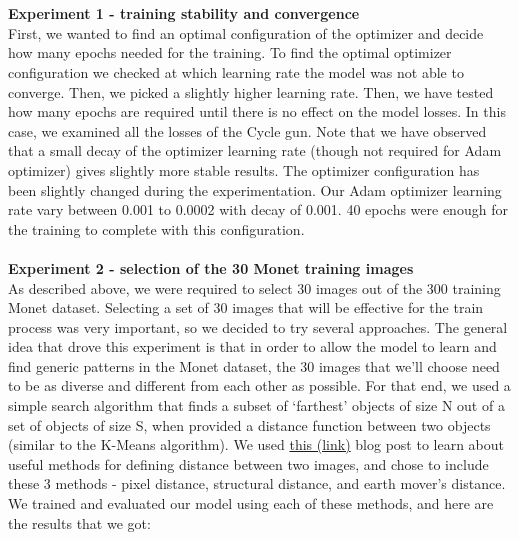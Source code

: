 \documentclass{article}
\begin{document}
\\\\
\newblock
\textbf{Experiment 1 - training stability and convergence}
\\
First, we wanted to find an optimal configuration of the optimizer and decide how many epochs needed for the training.
To find the optimal optimizer configuration we checked at which learning rate the model was not able to converge. Then, we picked a slightly higher learning rate.
Then, we have tested how many epochs are required until there is no effect on the model losses. In this case, we examined all the losses of the Cycle gun.
Note that we have observed that a small decay of the optimizer learning rate (though not required for Adam optimizer) gives slightly more stable results.
The optimizer configuration has been slightly changed during the experimentation.
Our Adam optimizer learning rate vary between 0.001 to 0.0002 with decay of 0.001.
40 epochs were enough for the training to complete with this configuration.
\\\\
\newblock
\textbf{Experiment 2 - selection of the 30 Monet training images}
\\
As described above, we were required to select 30 images out of the 300 training Monet dataset. Selecting a set of 30 images that will be effective for the train process was very important, so we decided to try several approaches. The general idea that drove this experiment is that in order to allow the model to learn and find generic patterns in the Monet dataset, the 30 images that we’ll choose need to be as diverse and different from each other as possible. For that end, we used a simple search algorithm that finds a subset of ‘farthest’ objects of size N out of a set of objects of size S, when provided a distance function between two objects (similar to the K-Means algorithm). We used \href{https://gist.github.com/duhaime/211365edaddf7ff89c0a36d9f3f7956c}{this (link)} blog post to learn about useful methods for defining distance between two images, and chose to include these 3 methods - pixel distance, structural distance, and earth mover’s distance. We trained and evaluated our model using each of these methods, and here are the results that we got:
\end{document}
